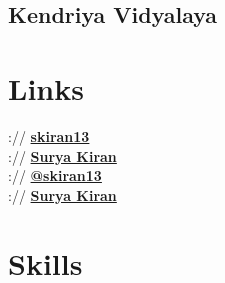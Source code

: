\documentclass[]{surya-resume}
\begin{document}
\begin{minipage}[t]{0.33\textwidth}
\subsection{Kendriya Vidyalaya}
\sectionsep


\section{Links} 
:// \href{https://github.com/skiran13}{\bf skiran13} \\
://  \href{https://www.linkedin.com/in/surya-kiran-suresh-569548166/}{\bf Surya Kiran} \\
://  \href{https://twitter.com/skiran13}{\bf @skiran13} \\
://  \href{https://www.quora.com/profile/Surya-Kiran-34}{\bf Surya Kiran} \\
\sectionsep


%


\section{Skills}

\end{minipage}
\end{document}
